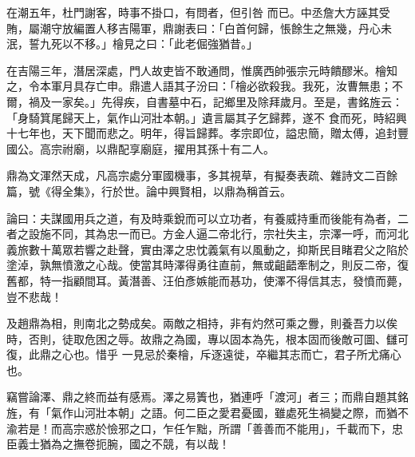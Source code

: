 \begin{pinyinscope}
 在潮五年，杜門謝客，時事不掛口，有問者，但引咎
 而已。中丞詹大方誣其受賄，屬潮守放編置人移吉陽軍，鼎謝表曰：「白首何歸，悵餘生之無幾，丹心未泯，誓九死以不移。」檜見之曰：「此老倔強猶昔。」



 在吉陽三年，潛居深處，門人故吏皆不敢通問，惟廣西帥張宗元時饋醪米。檜知之，令本軍月具存亡申。鼎遣人語其子汾曰：「檜必欲殺我。我死，汝曹無患；不爾，禍及一家矣。」先得疾，自書墓中石，記鄉里及除拜歲月。至是，書銘旌云：「身騎箕尾歸天上，氣作山河壯本朝。」遺言屬其子乞歸葬，遂不
 食而死，時紹興十七年也，天下聞而悲之。明年，得旨歸葬。孝宗即位，謚忠簡，贈太傅，追封豐國公。高宗祔廟，以鼎配享廟庭，擢用其孫十有二人。



 鼎為文渾然天成，凡高宗處分軍國機事，多其視草，有擬奏表疏、雜詩文二百餘篇，號《得全集》，行於世。論中興賢相，以鼎為稱首云。



 論曰：夫謀國用兵之道，有及時乘銳而可以立功者，有養威持重而後能有為者，二者之設施不同，其為忠一而已。方金人逼二帝北行，宗社失主，宗澤一呼，而河北
 義旅數十萬眾若響之赴聲，實由澤之忠忱義氣有以風動之，抑斯民目睹君父之陷於塗淖，孰無憤激之心哉。使當其時澤得勇往直前，無或齟齬牽制之，則反二帝，復舊都，特一指顧間耳。黃潛善、汪伯彥嫉能而惎功，使澤不得信其志，發憤而薨，豈不悲哉！



 及趙鼎為相，則南北之勢成矣。兩敵之相持，非有灼然可乘之釁，則養吾力以俟時，否則，徒取危困之辱。故鼎之為國，專以固本為先，根本固而後敵可圖、讎可復，此鼎之心也。惜乎
 一見忌於秦檜，斥逐遠徙，卒繼其志而亡，君子所尤痛心也。



 竊嘗論澤、鼎之終而益有感焉。澤之易簀也，猶連呼「渡河」者三；而鼎自題其銘旌，有「氣作山河壯本朝」之語。何二臣之愛君憂國，雖處死生禍變之際，而猶不渝若是！而高宗惑於憸邪之口，乍任乍黜，所謂「善善而不能用」，千載而下，忠臣義士猶為之撫卷扼腕，國之不競，有以哉！



\end{pinyinscope}